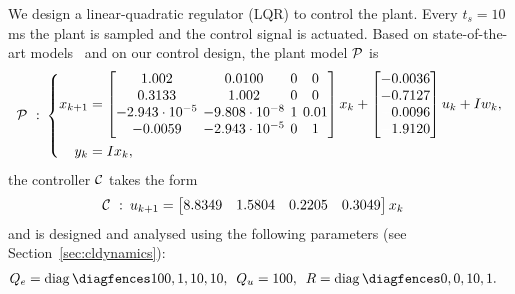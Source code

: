 We design a linear-quadratic regulator (LQR) to control the plant. 
Every $t_s=10\,$ms the plant is sampled and the control signal is actuated.
Based on state-of-the-art models~\cite{Cazzolato:2011} and on our control design, the plant model $\mathcal{P}$ is
\begin{equation}
    \label{eq:furuta}
    \setlength\arraycolsep{2pt}
    \begin{aligned}
        \plant \,\, : \,\, & \left\{ 
        \begin{aligned}
            x_{k+1} &= 
            \begin{bmatrix*}[c] 
                1.002 & 0.0100 & 0 & 0 \\
                0.3133 & 1.002 & 0 & 0 \\
                -2.943\cdot 10^{-5} & -9.808\cdot 10^{-8} & 1 & 0.01 \\
                -0.0059 & -2.943\cdot 10^{-5} & 0 & 1
            \end{bmatrix*} x_k + 
            \begin{bmatrix*}[c]
                -0.0036 \\
                -0.7127 \\
                \textcolor{white}{+}0.0096 \\
                \textcolor{white}{+}1.9120
            \end{bmatrix*} u_k + I w_k,\\
            y_k &= I x_k, 
        \end{aligned} \right. \\
    \end{aligned}
\end{equation}
the controller $\mathcal{C}$ takes the form
\begin{equation}
    \label{eq:furuta2}
    \begin{aligned}
        \controller \,\, : \,\,\, & u_{k+1} = 
        \begin{bmatrix*}[c]
        8.8349 & 1.5804 & 0.2205 & 0.3049
        \end{bmatrix*} x_k 
    \end{aligned}
\end{equation}
and is designed and analysed using the following parameters (see Section~\ref{sec:cldynamics}):
\begin{equation}
    \label{eq:furuta3}
    \begin{aligned}
        Q_e &= \diag{100,1,10,10}, \,\,\, Q_u = 100, \,\,\, R = \diag{0, 0, 10, 1}.
    \end{aligned}
\end{equation}

